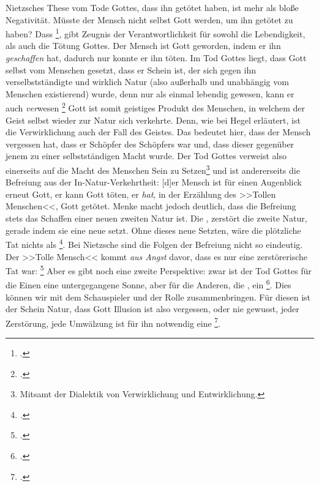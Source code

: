 \documentclass[12pt, a4paper, openany]{report}
\begin{document}
Nietzsches These vom Tode Gottes, dass  ihn getötet haben, ist mehr als bloße Negativität. 
Müsste der Mensch nicht selbst Gott werden, um ihn getötet zu haben?
Dass \footcite[][481]{nietzsche_morgenrote_1999}, gibt Zeugnis der Verantwortlichkeit für sowohl die Lebendigkeit, als auch die Tötung Gottes.
Der Mensch ist Gott geworden, indem er ihn \emph{geschaffen} hat, dadurch nur konnte er ihn töten. 
Im Tod Gottes liegt, dass Gott selbst vom Menschen gesetzt, dass er Schein ist, der sich gegen ihn verselbstständigte und wirklich Natur (also außerhalb und unabhängig vom Menschen existierend) wurde, denn nur als einmal lebendig gewesen, kann er auch \emph{ver}wesen \footcite[][481]{nietzsche_morgenrote_1999}
Gott ist somit geistiges Produkt des Menschen, in welchem der Geist selbst wieder zur Natur sich verkehrte.
Denn, wie bei Hegel erläutert, ist die Verwirklichung auch der Fall des Geistes.
Das bedeutet hier, dass der Mensch vergessen hat, dass er Schöpfer des Schöpfers war und, dass dieser gegenüber jenem zu einer selbstständigen Macht wurde.
Der Tod Gottes verweist also einerseits auf die Macht des Menschen Sein zu Setzen\footnote{Mitsamt der Dialektik von Verwirklichung und Entwirklichung.} und ist andererseits die Befreiung aus der In-Natur-Verkehrtheit:
[d]er Mensch ist für einen Augenblick erneut Gott, er kann Gott töten, er \emph{hat}, in der Erzählung des >>Tollen Menschen<<, Gott getötet.
Menke macht jedoch deutlich, dass die Befreiung stets das Schaffen einer neuen zweiten Natur ist. 
Die , zerstört die  zweite Natur, gerade indem sie eine neue setzt.
Ohne dieses neue Setzten, wäre die plötzliche Tat nichts als \footcite[][§ 5 A, S. 39]{hegel_grundlinien_2017}.
Bei Nietzsche sind die Folgen der Befreiung nicht so eindeutig.
Der >>Tolle Mensch<< kommt \emph{aus Angst} davor, dass es nur eine zerstörerische Tat war: \footcite[][481]{nietzsche_morgenrote_1999}
Aber es gibt noch eine zweite Perspektive: 
zwar ist der Tod Gottes für die Einen eine untergegangene Sonne, aber für die Anderen, die , ein \footcite[][S. 573 - S. 574]{nietzsche_morgenrote_1999}.
Dies können wir mit dem Schauspieler und der Rolle zusammenbringen. 
Für diesen ist der Schein Natur, dass Gott Illusion ist also vergessen, oder nie gewusst, jeder Zerstörung, jede Umwälzung ist für ihn notwendig eine \footcite[][573]{nietzsche_morgenrote_1999}.
\end{document}

